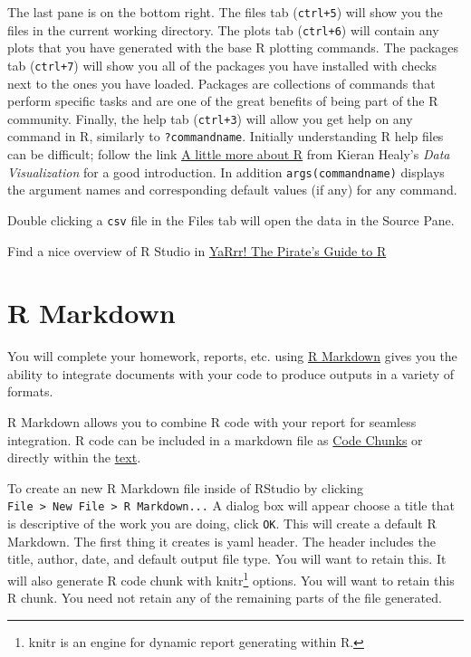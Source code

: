\documentclass[]{book}
\let\rmarkdownfootnote\footnote%
\def\footnote{\protect\rmarkdownfootnote}
\begin{document}
The last pane is on the bottom right. The files tab (\texttt{ctrl+5}) will show you the files in the current working directory. The plots tab (\texttt{ctrl+6}) will contain any plots that you have generated with the base R plotting commands. The packages tab (\texttt{ctrl+7}) will show you all of the packages you have installed with checks next to the ones you have loaded. Packages are collections of commands that perform specific tasks and are one of the great benefits of being part of the R community. Finally, the help tab (\texttt{ctrl+3}) will allow you get help on any command in R, similarly to \texttt{?commandname}. Initially understanding R help files can be difficult; follow the link \href{https://socviz.co/appendix.html\#a-little-more-about-r}{A little more about R} from Kieran Healy's \emph{Data Visualization} for a good introduction. In addition \texttt{args(commandname)} displays the argument names and corresponding default values (if any) for any command.

Double clicking a \texttt{csv} file in the Files tab will open the data in the Source Pane.

Find a nice overview of R Studio in \href{https://bookdown.org/ndphillips/YaRrr/started.html}{YaRrr! The Pirate's Guide to R}

\hypertarget{r-markdown}{%
\section{R Markdown}\label{r-markdown}}

You will complete your homework, reports, etc. using \href{https://bookdown.org/yihui/rmarkdown/}{R Markdown} gives you the ability to integrate documents with your code to produce outputs in a variety of formats.

R Markdown allows you to combine R code with your report for seamless integration. R code can be included in a markdown file as \href{https://rmarkdown.rstudio.com/lesson-3.html}{Code Chunks} or directly within the \href{https://rmarkdown.rstudio.com/lesson-4.html}{text}.

To create an new R Markdown file inside of RStudio by clicking \texttt{File\ \textgreater{}\ New\ File\ \textgreater{}\ R\ Markdown...} A dialog box will appear choose a title that is descriptive of the work you are doing, click \texttt{OK}. This will create a default R Markdown. The first thing it creates is yaml header. The header includes the title, author, date, and default output file type. You will want to retain this. It will also generate R code chunk with knitr\footnote{knitr is an engine for dynamic report generating within R.} options. You will want to retain this R chunk. You need not retain any of the remaining parts of the file generated.
\end{document}

